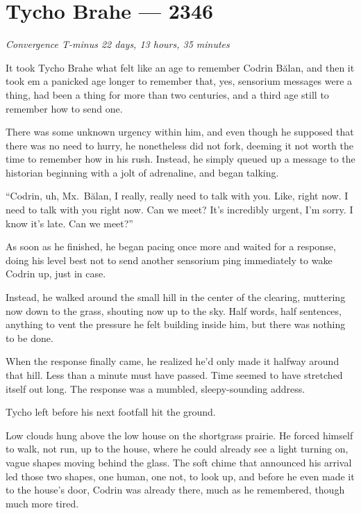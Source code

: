 \hypertarget{tycho-brahe-2346}{%
\chapter{Tycho Brahe — 2346}}

\begin{center}
\emph{Convergence T-minus 22 days, 13 hours, 35 minutes}
\end{center}

\noindent It took Tycho Brahe what felt like an age to remember Codrin Bălan, and then it took em a panicked age longer to remember that, yes, sensorium messages were a thing, had been a thing for more than two centuries, and a third age still to remember how to send one.

There was some unknown urgency within him, and even though he supposed that there was no need to hurry, he nonetheless did not fork, deeming it not worth the time to remember how in his rush. Instead, he simply queued up a message to the historian beginning with a jolt of adrenaline, and began talking.

``Codrin, uh, Mx.~Bălan, I really, really need to talk with you. Like, right now. I need to talk with you right now. Can we meet? It's incredibly urgent, I'm sorry. I know it's late. Can we meet?''

As soon as he finished, he began pacing once more and waited for a response, doing his level best not to send another sensorium ping immediately to wake Codrin up, just in case.

Instead, he walked around the small hill in the center of the clearing, muttering now down to the grass, shouting now up to the sky. Half words, half sentences, anything to vent the pressure he felt building inside him, but there was nothing to be done.

When the response finally came, he realized he'd only made it halfway around that hill. Less than a minute must have passed. Time seemed to have stretched itself out long. The response was a mumbled, sleepy-sounding address.

Tycho left before his next footfall hit the ground.

Low clouds hung above the low house on the shortgrass prairie. He forced himself to walk, not run, up to the house, where he could already see a light turning on, vague shapes moving behind the glass. The soft chime that announced his arrival led those two shapes, one human, one not, to look up, and before he even made it to the house's door, Codrin was already there, much as he remembered, though much more tired.

